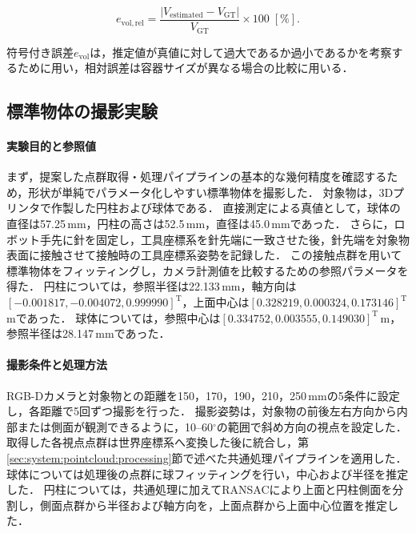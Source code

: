 \begin{equation}
  e_{\mathrm{vol,rel}} = \frac{|V_{\mathrm{estimated}}-V_{\mathrm{GT}}|}{V_{\mathrm{GT}}}\times100\;[\%].
  \label{eq:system:vol_error_rel}
\end{equation}

符号付き誤差$e_{\mathrm{vol}}$は，推定値が真値に対して過大であるか過小であるかを考察するために用い，相対誤差は容器サイズが異なる場合の比較に用いる．

\subsection{標準物体の撮影実験}
\label{sec:system:pointcloud:evaluation:standard-objects}

\paragraph{実験目的と参照値}

まず，提案した点群取得・処理パイプラインの基本的な幾何精度を確認するため，形状が単純でパラメータ化しやすい標準物体を撮影した．
対象物は，3Dプリンタで作製した円柱および球体である．
直接測定による真値として，球体の直径は57.25\,mm，円柱の高さは52.5\,mm，直径は45.0\,mmであった．
さらに，ロボット手先に針を固定し，工具座標系を針先端に一致させた後，針先端を対象物表面に接触させて接触時の工具座標系姿勢を記録した．
この接触点群を用いて標準物体をフィッティングし，カメラ計測値を比較するための参照パラメータを得た．
円柱については，参照半径は22.133\,mm，軸方向は$[-0.001817, -0.004072, 0.999990]^{\mathrm{T}}$，上面中心は$[0.328219, 0.000324, 0.173146]^{\mathrm{T}}$\,mであった．
球体については，参照中心は$[0.334752, 0.003555, 0.149030]^{\mathrm{T}}$\,m，参照半径は28.147\,mmであった．

\paragraph{撮影条件と処理方法}

RGB-Dカメラと対象物との距離を150，170，190，210，250\,mmの5条件に設定し，各距離で5回ずつ撮影を行った．
撮影姿勢は，対象物の前後左右方向から内部または側面が観測できるように，10--60$^{\circ}$の範囲で斜め方向の視点を設定した．
取得した各視点点群は世界座標系へ変換した後に統合し，第\ref{sec:system:pointcloud:processing}節で述べた共通処理パイプラインを適用した．
球体については処理後の点群に球フィッティングを行い，中心および半径を推定した．
円柱については，共通処理に加えてRANSACにより上面と円柱側面を分割し，側面点群から半径および軸方向を，上面点群から上面中心位置を推定した．

